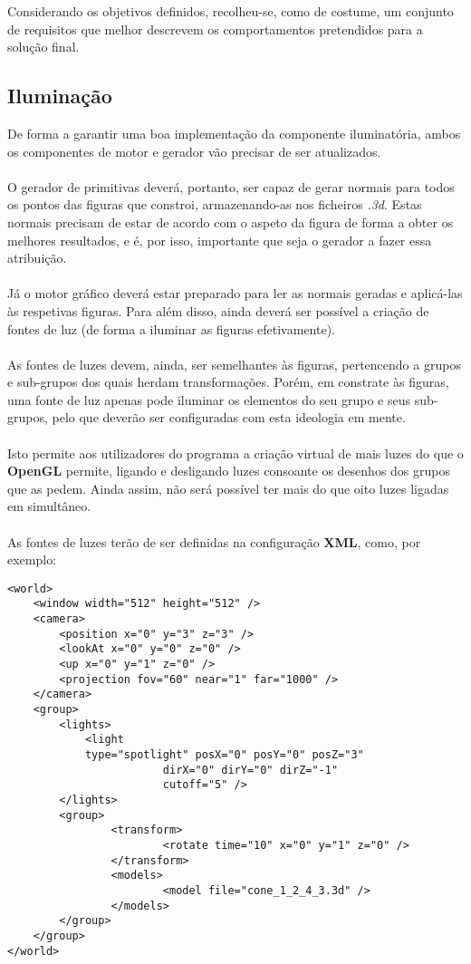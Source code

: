 Considerando os objetivos definidos, recolheu-se, como de costume,
um conjunto de requisitos que melhor descrevem os comportamentos
pretendidos para a solução final.

\subsection{Iluminação}

De forma a garantir uma boa implementação da componente
iluminatória, ambos os componentes de motor e gerador vão
precisar de ser atualizados.\\
\\
O gerador de primitivas deverá, portanto, ser capaz de gerar
normais para todos os pontos das figuras que constroi, armazenando-as
nos ficheiros \textit{.3d}. Estas
normais precisam de estar de acordo com o aspeto da figura de
forma a obter os melhores resultados, e é, por isso, importante
que seja o gerador a fazer essa atribuição.\\
\\
Já o motor gráfico deverá estar preparado para ler as normais
geradas e aplicá-las às respetivas figuras. Para além disso,
ainda deverá ser possível a criação de fontes de luz (de forma
a iluminar as figuras efetivamente).\\
\\
As fontes de luzes devem, ainda, ser semelhantes às figuras,
pertencendo a grupos e sub-grupos dos quais herdam transformações.
Porém, em constrate às figuras, uma fonte de luz apenas pode
iluminar os elementos do seu grupo e seus sub-grupos, pelo que
deverão ser configuradas com esta ideologia em mente.\\
\\
Isto permite aos utilizadores do programa a criação virtual
de mais luzes do que o \textbf{OpenGL} permite, ligando e
desligando luzes consoante os desenhos dos grupos que as pedem.
Ainda assim, não será possível ter mais do que oito luzes
ligadas em simultâneo.\\
\\
As fontes de luzes terão de ser definidas na configuração
\textbf{XML}, como, por exemplo:\\

\begin{tcolorbox}[
    colback=blue!10!white,
    colframe=black!50!black,
    after upper={\hfill\textbf{xml}}
]
\begin{verbatim}
<world> 
    <window width="512" height="512" />
    <camera>  
	    <position x="0" y="3" z="3" />
	    <lookAt x="0" y="0" z="0" />
	    <up x="0" y="1" z="0" />
        <projection fov="60" near="1" far="1000" /> 
    </camera>	
	<group>
        <lights> 
            <light
            type="spotlight" posX="0" posY="0" posZ="3"
			            dirX="0" dirY="0" dirZ="-1"
			            cutoff="5" />
        </lights>
		<group> 
			    <transform>
				        <rotate time="10" x="0" y="1" z="0" />
			    </transform>
			    <models> 
				        <model file="cone_1_2_4_3.3d" />
			    </models>
		</group>		
 	</group>
</world>
\end{verbatim}
\end{tcolorbox}

